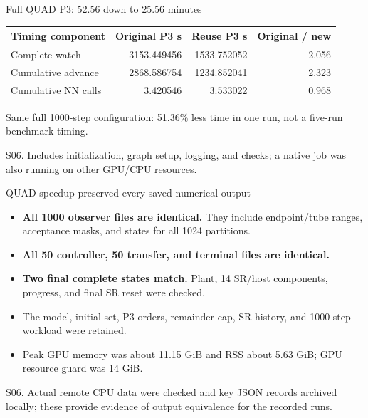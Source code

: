\documentclass[aspectratio=169,11pt]{beamer}
\newcommand{\src}[1]{\par\vfill{\fontsize{7}{9}\selectfont\color{gray}#1\par}}
\begin{document}
\begin{frame}[t]{Full QUAD P3: 52.56 down to 25.56 minutes}
\relax
\relax
\begin{center}
\end{center}
{\footnotesize\setlength{\tabcolsep}{3.2pt}\renewcommand{\arraystretch}{1.18}
\noindent\begin{tabular*}{\linewidth}{@{\extracolsep{\fill}}lrrr@{}}\toprule
\textbf{Timing component} & \textbf{Original P3 s} & \textbf{Reuse P3 s} & \textbf{Original / new}\\ \midrule
Complete watch & 3153.449456 & 1533.752052 & 2.056\\
Cumulative advance & 2868.586754 & 1234.852041 & 2.323\\
Cumulative NN calls & 3.420546 & 3.533022 & 0.968\\
\bottomrule\end{tabular*}\par{}}\vspace{0.2cm}Same full 1000-step configuration: 51.36\% less time in one run, not a five-run benchmark timing.
\src{S06. Includes initialization, graph setup, logging, and checks; a native job was also running on other GPU/CPU resources.}
\end{frame}

\begin{frame}[t]{QUAD speedup preserved every saved numerical output}
\relax
\relax
\begin{itemize}
\item \textbf{All 1000 observer files are identical.} They include endpoint/tube ranges, acceptance masks, and states for all 1024 partitions.
\item \textbf{All 50 controller, 50 transfer, and terminal files are identical.}
\item \textbf{Two final complete states match.} Plant, 14 SR/host components, progress, and final SR reset were checked.
\item The model, initial set, P3 orders, remainder cap, SR history, and 1000-step workload were retained.
\item Peak GPU memory was about 11.15 GiB and RSS about 5.63 GiB; GPU resource guard was 14 GiB.
\end{itemize}
\src{S06. Actual remote CPU data were checked and key JSON records archived locally; these provide evidence of output equivalence for the recorded runs.}
\end{frame}
\end{document}
